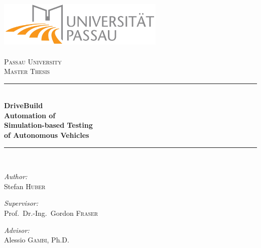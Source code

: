 \begin{titlepage}

\date{}

\begin{center}

\includegraphics[width=0.6\textwidth]{./pictures/Logo-Uni-Passau.jpg}\\[1cm]

\ \\[1cm]

\textsc{\LARGE Passau University}\\[1.5cm]

\textsc{\Large Master Thesis}\\[0.5cm]

\newcommand{\HRule}{\rule{\linewidth}{0.5mm}}
\HRule{}\\[0.4cm]
{\huge \bfseries DriveBuild\\Automation of\\Simulation-based Testing\\of Autonomous Vehicles}\\[0.4cm]

\HRule{}\\[1.5cm]

\begin{minipage}[t]{0.45\textwidth}
\begin{flushleft} \large
\emph{Author:}\\
Stefan \textsc{Huber}
\end{flushleft}
\end{minipage}
\hfill
\begin{minipage}[t]{0.45\textwidth}
\begin{flushright} \large
\emph{Supervisor:} \\
Prof.\ Dr.-Ing.\ Gordon \textsc{Fraser}\\

\vspace{0.5cm}

\emph{Advisor:}\\
Alessio \textsc{Gambi}, Ph.D.
\end{flushright}
\end{minipage}

\vfill
\vfill

\vfill


\end{center}

\end{titlepage}
